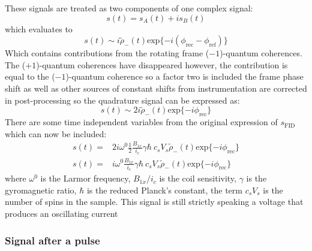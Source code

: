 These signals are treated as two components of one complex signal:
\begin{equation}
  s(t) = s_A(t) + is_B(t)
\end{equation}
which evaluates to
\begin{equation}
  s(t) \sim i\tilde{\rho}_-(t)\text{exp}\{-i(\phi_{\text{rec}} - \phi_{\text{ref}})\}
\end{equation}
Which contains contributions from the rotating frame ($-1$)-quantum coherences. The ($+1$)-quantum coherences
have disappeared however, the contribution is equal to the ($-1$)-quantum coherence so a factor two is included
the frame phase shift as well as other sources of constant shifts from instrumentation are corrected in post-processing
so the quadrature signal can be expressed as:
\begin{equation}
  s(t) \sim 2i\tilde{\rho}_-(t)\text{exp}\{-i\phi_{\text{rec}}\}
\end{equation}
There are some time independent variables from the original expression of $s_{\text{FID}}$ which can now be included:
\begin{align}
  s(t) =& 2i\omega^0\frac{1}{2}\frac{B_{1x}}{i_c}\gamma\hbar~c_sV_s\tilde{\rho}_-(t)\text{exp}\{-i\phi_{\text{rec}}\}\\
  s(t) =& i\omega^0\frac{B_{1x}}{i_c}\gamma\hbar~c_sV_s\tilde{\rho}_-(t)\text{exp}\{-i\phi_{\text{rec}}\}
\end{align}
where $\omega^0$ is the Larmor frequency, $B_{1x}/i_c$ is the coil sensitivity, $\gamma$ is the gyromagnetic ratio,
$\hbar$ is the reduced Planck's constant, the term $c_sV_s$ is the number of spins in the sample. This signal is still strictly speaking a voltage that produces an oscillating current

\subsubsection{Signal after a pulse}


